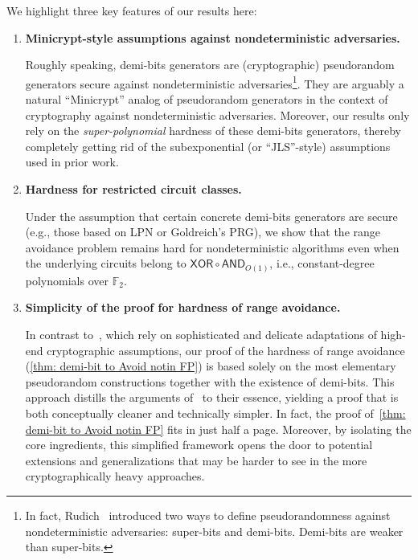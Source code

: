\documentclass[10pt,a4paper]{article}
\theoremstyle{definition}
\theoremstyle{remark}
\newcommand{\AND}{\mathsf{AND}}
\newcommand{\XOR}{\mathsf{XOR}}
\begin{document}
We highlight three key features of our results here:
\begin{enumerate}
    \item {\bf Minicrypt-style assumptions against nondeterministic adversaries.}
    
    Roughly speaking, demi-bits generators are (cryptographic) pseudorandom generators secure against nondeterministic adversaries\footnote{In fact, Rudich~\cite{Rudich97} introduced two ways to define pseudorandomness against nondeterministic adversaries: super-bits and demi-bits. Demi-bits are weaker than super-bits.}. They are arguably a natural ``Minicrypt'' analog of pseudorandom generators in the context of cryptography against nondeterministic adversaries. Moreover, our results only rely on the \emph{super-polynomial} hardness of these demi-bits generators, thereby completely getting rid of the subexponential (or ``JLS''-style) assumptions used in prior work.
    \item {\bf Hardness for restricted circuit classes.}
    
    Under the assumption that certain concrete demi-bits generators are secure (e.g., those based on LPN or Goldreich's PRG), we show that the range avoidance problem remains hard for nondeterministic algorithms even when the underlying circuits belong to $\XOR\circ\AND_{O(1)}$, i.e., constant-degree polynomials over $\mathbb{F}_2$.

    \item {\bf Simplicity of the proof for hardness of range avoidance.}
    
    In contrast to~\cite{DBLP:conf/stoc/IlangoLW23,DBLP:conf/stoc/ChenL24}, which rely on sophisticated and delicate adaptations of high-end cryptographic assumptions, our proof of the hardness of range avoidance (\autoref{thm: demi-bit to Avoid notin FP}) is based solely on the most elementary pseudorandom constructions together with the existence of demi-bits. This approach distills the arguments of~\cite{DBLP:conf/stoc/IlangoLW23,DBLP:conf/stoc/ChenL24} to their essence, yielding a proof that is both conceptually cleaner and technically simpler. In fact, the proof of~\autoref{thm: demi-bit to Avoid notin FP} fits in just half a page. Moreover, by isolating the core ingredients, this simplified framework opens the door to potential extensions and generalizations that may be harder to see in the more cryptographically heavy approaches.
    
\end{enumerate}
\end{document}
